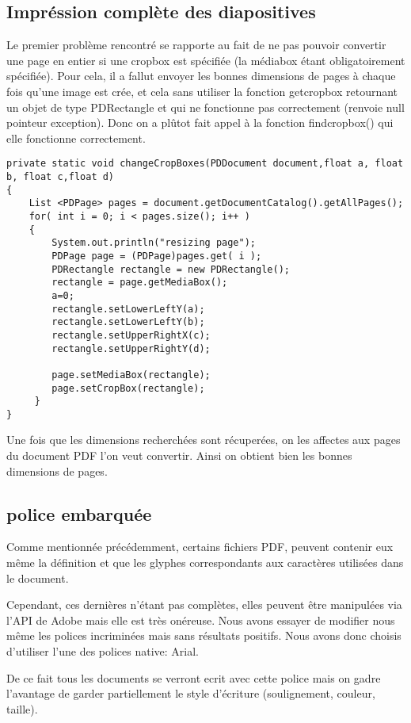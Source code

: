     	\subsection{Impréssion complète des diapositives}
	    Le premier problème rencontré se rapporte au fait de ne pas pouvoir convertir
        une page en entier si une cropbox est spécifiée (la médiabox étant obligatoirement 
        spécifiée). Pour cela, il a fallut envoyer les bonnes dimensions de pages 
        à chaque fois qu'une image est crée, et cela sans utiliser la fonction
        getcropbox retournant un objet de type PDRectangle et qui ne fonctionne 
        pas correctement (renvoie null pointeur exception). Donc on a plûtot fait
        appel à la fonction findcropbox() qui elle fonctionne correctement.


    \lstset{language=Java}
	\begin{lstlisting} 
private static void changeCropBoxes(PDDocument document,float a, float b, float c,float d)
{
	List <PDPage> pages = document.getDocumentCatalog().getAllPages();
	for( int i = 0; i < pages.size(); i++ )
	{
        System.out.println("resizing page");
        PDPage page = (PDPage)pages.get( i );
        PDRectangle rectangle = new PDRectangle();
        rectangle = page.getMediaBox();
        a=0;
        rectangle.setLowerLeftY(a);
        rectangle.setLowerLeftY(b);
        rectangle.setUpperRightX(c);
        rectangle.setUpperRightY(d);

        page.setMediaBox(rectangle);
        page.setCropBox(rectangle);
	 }
}
 \end{lstlisting}


Une fois que les dimensions recherchées sont récuperées, on les affectes aux pages 
du document PDF l'on veut convertir. Ainsi on obtient bien les bonnes dimensions 
de pages.


	\subsection{police embarquée}
    Comme mentionnée précédemment, certains fichiers PDF, peuvent contenir eux 
même la définition et que les glyphes correspondants aux caractères utilisées dans 
le document.

    Cependant, ces dernières n'étant pas complètes, elles peuvent être manipulées 
via l'API de Adobe mais elle est très onéreuse. Nous avons essayer de modifier 
nous même les polices incriminées mais sans résultats positifs.
Nous avons donc choisis d'utiliser l'une des polices native: Arial.

    De ce fait tous les documents  se verront ecrit avec cette police mais on gadre l'avantage de garder partiellement le style d'écriture (soulignement, couleur, taille).








